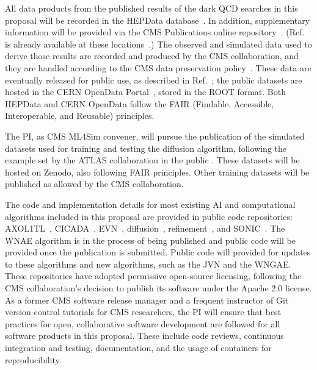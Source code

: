 All data products from the published results of the dark QCD searches in this proposal will be recorded in the HEPData database~\cite{Maguire:2017ypu}.
In addition, supplementary information will be provided via the CMS Publications online repository~\cite{cmspub}.
(Ref.~\cite{CMS:2021dzg} is already available at these locations~\cite{hepdata,EXO-19-020}.)
The observed and simulated data used to derive those results are recorded and produced by the CMS collaboration,
and they are handled according to the CMS data preservation policy~\cite{cmsdata}.
These data are eventually released for public use, as described in Ref.~\cite{cmsdata};
the public datasets are hosted in the CERN OpenData Portal~\cite{opendata}, stored in the ROOT format.
Both HEPData and CERN OpenData follow the FAIR (Findable, Accessible, Interoperable, and Reusable) principles.

The PI, as CMS ML4Sim convener, will pursue the publication of the simulated datasets used for training and testing the diffusion algorithm,
following the example set by the ATLAS collaboration in the public \challenge.
These datasets will be hosted on Zenodo, also following FAIR principles.
Other training datasets will be published as allowed by the CMS collaboration.

The code and implementation details for most existing AI and computational algorithms included in this proposal are provided in public code repositories:
AXOL1TL~\cite{AXOL1TL:repo}, CICADA~\cite{CICADA:repo}, EVN~\cite{EVN:repo}, diffusion~\cite{CaloDiffusion:repo}, refinement~\cite{Refinement:repo}, and SONIC~\cite{SONIC:repo}.
The WNAE algorithm is in the process of being published and public code will be provided once the publication is submitted.
Public code will provided for updates to these algorithms and new algorithms, such as the JVN and the WNGAE.
These repositories have adopted permissive open-source licensing, following the CMS collaboration's decision to publish its software under the Apache 2.0 license.
As a former CMS software release manager and a frequent instructor of Git version control tutorials for CMS researchers,
the PI will ensure that best practices for open, collaborative software development are followed for all software products in this proposal.
These include code reviews, continuous integration and testing, documentation, and the usage of containers for reproducibility.
